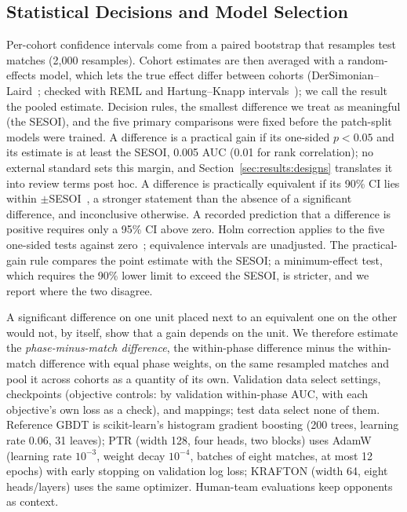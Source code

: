 \documentclass[sigconf,anonymous]{acmart}
\begin{document}
\subsection{Statistical Decisions and Model Selection}
\label{sec:method:stats}
Per-cohort confidence intervals come from a paired bootstrap that resamples test matches (2,000 resamples). Cohort estimates are then averaged with a random-effects model, which lets the true effect differ between cohorts (DerSimonian--Laird~\cite{DerSimonian86}; checked with REML and Hartung--Knapp intervals~\cite{HartungKnapp01}); we call the result the pooled estimate. Decision rules, the smallest difference we treat as meaningful (the SESOI), and the five primary comparisons were fixed before the patch-split models were trained. A difference is a practical gain if its one-sided $p<0.05$ and its estimate is at least the SESOI, 0.005 AUC (0.01 for rank correlation); no external standard sets this margin, and Section~\ref{sec:results:designs} translates it into review terms post hoc. A difference is practically equivalent if its 90\% CI lies within $\pm$SESOI~\cite{Schuirmann87}, a stronger statement than the absence of a significant difference, and inconclusive otherwise. A recorded prediction that a difference is positive requires only a 95\% CI above zero. Holm correction applies to the five one-sided tests against zero~\cite{Holm79}; equivalence intervals are unadjusted. The practical-gain rule compares the point estimate with the SESOI; a minimum-effect test, which requires the 90\% lower limit to exceed the SESOI, is stricter, and we report where the two disagree.

A significant difference on one unit placed next to an equivalent one on the other would not, by itself, show that a gain depends on the unit. We therefore estimate the \emph{phase-minus-match difference}, the within-phase difference minus the within-match difference with equal phase weights, on the same resampled matches and pool it across cohorts as a quantity of its own. Validation data select settings, checkpoints (objective controls: by validation within-phase AUC, with each objective's own loss as a check), and mappings; test data select none of them. Reference GBDT is scikit-learn's histogram gradient boosting (200 trees, learning rate 0.06, 31 leaves); PTR (width 128, four heads, two blocks) uses AdamW (learning rate $10^{-3}$, weight decay $10^{-4}$, batches of eight matches, at most 12 epochs) with early stopping on validation log loss; KRAFTON (width 64, eight heads/layers) uses the same optimizer. Human-team evaluations keep opponents as context.
\end{document}

